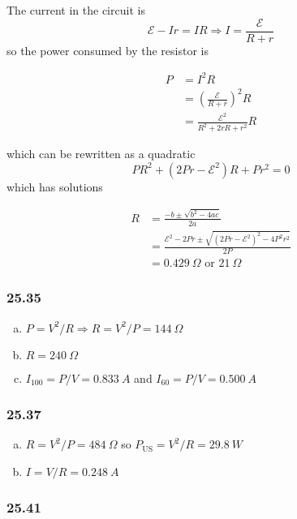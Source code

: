 \documentclass{article}
\begin{document}
The current in the circuit is \[\mathcal{E} - I r = I R \Rightarrow I = \frac{\mathcal{E}}{R + r}\] so the power consumed by the resistor is

\begin{align*}
  P & = I^2 R                                        \\
    & = \left( \frac{\mathcal{E}}{R + r} \right)^2 R \\
    & = \frac{\mathcal{E}^2}{R^2 + 2 r R + r^2} R
\end{align*}

which can be rewritten as a quadratic \[P R^2 + (2 P r - \mathcal{E}^2) R + P r^2 = 0\] which has solutions

\begin{align*}
  R & = \frac{-b \pm \sqrt{b^2 - 4 a c}}{2 a}                                              \\
    & = \frac{\mathcal{E}^2 - 2 P r \pm \sqrt{(2 P r - \mathcal{E}^2)^2 - 4 P^2 r^2}}{2 P} \\
    & = \qty{0.429}{\Omega}\textrm{ or }\qty{21}{\Omega}
\end{align*}

\subsubsection{25.35}

\begin{enumerate}[(a)]
  \item $P = V^2 / R \Rightarrow R = V^2 / P = \qty{144}{\Omega}$

  \item $R = \qty{240}{\Omega}$

  \item $I_{100} = P / V = \qty{0.833}{A}$ and $I_{60} = P / V = \qty{0.500}{A}$
\end{enumerate}

\subsubsection{25.37}

\begin{enumerate}[(a)]
  \item $R = V^2 / P = \qty{484}{\Omega}$ so $P_\textrm{US} = V^2 / R = \qty{29.8}{W}$

  \item $I = V / R = \qty{0.248}{A}$
\end{enumerate}

\subsubsection{25.41}
\end{document}

